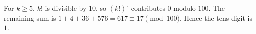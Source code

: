 For $k\ge5$, $k!$ is divisible by $10$, so $(k!)^2$ contributes $0$ modulo $100$. The remaining sum is $1+4+36+576=617\equiv17\pmod{100}$. Hence the tens digit is $\boxed1$.
